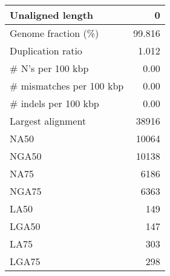 \documentclass[12pt,a4paper]{article}
\begin{document}
\begin{table}[ht]
\begin{center}
\begin{tabular}{|l*{1}{|r}|}
Unaligned length & 0 \\ \hline
Genome fraction (\%) & 99.816 \\ \hline
Duplication ratio & 1.012 \\ \hline
\# N's per 100 kbp & 0.00 \\ \hline
\# mismatches per 100 kbp & 0.00 \\ \hline
\# indels per 100 kbp & 0.00 \\ \hline
Largest alignment & 38916 \\ \hline
NA50 & 10064 \\ \hline
NGA50 & 10138 \\ \hline
NA75 & 6186 \\ \hline
NGA75 & 6363 \\ \hline
LA50 & 149 \\ \hline
LGA50 & 147 \\ \hline
LA75 & 303 \\ \hline
LGA75 & 298 \\ \hline
\end{tabular}
\end{center}
\end{table}
\end{document}
